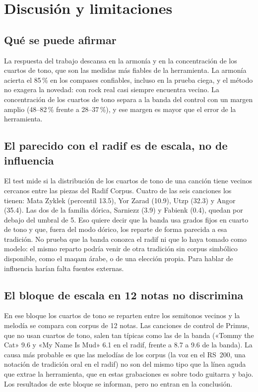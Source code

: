 \chapter{Discusión y limitaciones}\label{cap:discusion}

\section{Qué se puede afirmar}

La respuesta del trabajo descansa en la armonía y en la concentración de los cuartos de tono, que son las medidas más
fiables de la herramienta. La armonía acierta el 85\,\% en los compases confiables, incluso en la prueba ciega, y el
método no exagera la novedad: con rock real casi siempre encuentra vecino. La concentración de los cuartos de tono separa
a la banda del control con un margen amplio (48--82\,\% frente a 28--37\,\%), y ese margen es mayor que el error de la
herramienta.

\section{El parecido con el radif es de escala, no de influencia}

El test mide si la distribución de los cuartos de tono de una canción tiene vecinos cercanos entre las piezas del Radif
Corpus. Cuatro de las seis canciones los tienen: Mata Zyklek (percentil 13.5), Yor Zarad (10.9), Utzp (32.3) y Angor
(35.4). Las dos de la familia dórica, Sarniezz (3.9) y Fabienk (0.4), quedan por debajo del umbral de 5. Eso quiere decir
que la banda usa grados fijos en cuarto de tono y que, fuera del modo dórico, los reparte de forma parecida a esa tradición. No prueba que la banda conozca el radif ni que lo
haya tomado como modelo: el mismo reparto podría venir de otra tradición sin corpus simbólico disponible, como el maqam
árabe, o de una elección propia. Para hablar de influencia harían falta fuentes externas.

\section{El bloque de escala en 12 notas no discrimina}

En ese bloque los cuartos de tono se reparten entre los semitonos vecinos y la melodía se compara con corpus de 12 notas.
Las canciones de control de Primus, que no usan cuartos de tono, salen tan típicas como las de la banda («Tommy the Cat»
9.6 y «My Name Is Mud» 6.1 en el radif, frente a 8.7 a 9.6 de la banda). La causa más probable es que las melodías de los
corpus (la voz en el RS~200, una notación de tradición oral en el radif) no son del mismo tipo que la línea aguda que
extrae la herramienta, que en estas grabaciones es sobre todo guitarra y bajo. Los resultados de este bloque se informan,
pero no entran en la conclusión.

